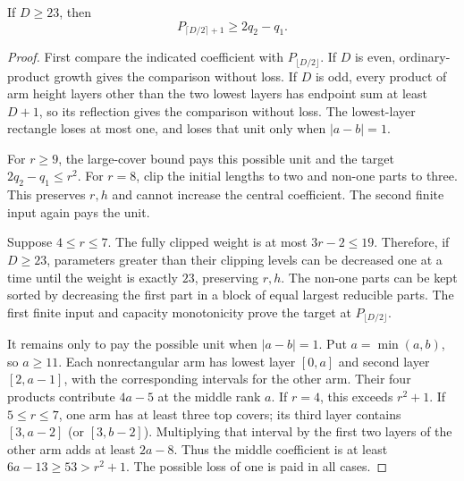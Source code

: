 \begin{theorem}
If $D\ge23$, then
\[
                  P_{\lceil D/2\rceil+1}\ge2q_2-q_1.
\]
\end{theorem}
\begin{proof}
First compare the indicated coefficient with $P_{\lfloor D/2\rfloor}$.
If $D$ is even, ordinary-product growth gives the comparison without loss.
If $D$ is odd, every product of arm height layers other than the two
lowest layers has endpoint sum at least $D+1$, so its reflection gives
the comparison without loss. The lowest-layer rectangle loses at most
one, and loses that unit only when $|a-b|=1$.

For $r\ge9$, the large-cover bound pays this possible unit and the
target $2q_2-q_1\le r^2$. For $r=8$, clip the initial lengths to two
and non-one parts to three. This preserves $r,h$ and cannot increase
the central coefficient. The second finite input again pays the unit.

Suppose $4\le r\le7$. The fully clipped weight is at most
$3r-2\le19$. Therefore, if $D\ge23$, parameters greater than their
clipping levels can be decreased one at a time until the weight is
exactly $23$, preserving $r,h$. The non-one parts can be kept sorted
by decreasing the first part in a block of equal largest reducible
parts. The first finite input and capacity monotonicity prove the target
at $P_{\lfloor D/2\rfloor}$.

It remains only to pay the possible unit when $|a-b|=1$.
Put $a=\min(a,b)$, so $a\ge11$. Each nonrectangular arm has lowest
layer $[0,a]$ and second layer $[2,a-1]$, with the corresponding
intervals for the other arm. Their four products contribute
$4a-5$ at the middle rank $a$. If $r=4$, this exceeds $r^2+1$.
If $5\le r\le7$, one arm has at least three top covers; its third
layer contains $[3,a-2]$ (or $[3,b-2]$). Multiplying that interval
by the first two layers of the other arm adds at least $2a-8$.
Thus the middle coefficient is at least $6a-13\ge53>r^2+1$.
The possible loss of one is paid in all cases.
\end{proof}

